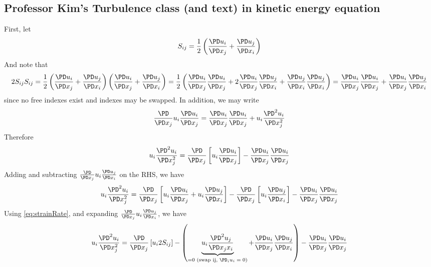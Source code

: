 \documentclass[11pt]{article}
\begin{document}
\subsection{Professor Kim's Turbulence class (and text) in kinetic energy equation}
First, let
\begin{equation} \label{eq:strainRate}
	S_{ij} = \frac{1}{2}
	\left(
	\frac{\PD u_i}{\PD x_j} +
	\frac{\PD u_j}{\PD x_i}
	\right)
\end{equation}
And note that
\begin{equation} \label{eq:strainIdentity}
	2 S_{ij} S_{ij} =
	\frac{1}{2} \left( \frac{\PD u_i}{\PD x_j} + \frac{\PD u_j}{\PD x_i} \right)
	\left( \frac{\PD u_i}{\PD x_j} + \frac{\PD u_j}{\PD x_i} \right)
	= \frac{1}{2} \left( \frac{\PD u_i}{\PD x_j} \frac{\PD u_i}{\PD x_j}
	+ 2 \frac{\PD u_i}{\PD x_j} \frac{\PD u_j}{\PD x_i}
	+ \frac{\PD u_j}{\PD x_i} \frac{\PD u_j}{\PD x_i} \right)
	= \frac{\PD u_i}{\PD x_j} \frac{\PD u_i}{\PD x_j}
	+ \frac{\PD u_i}{\PD x_j} \frac{\PD u_j}{\PD x_i}
\end{equation}
since no free indexes exist and indexes may be swapped. In addition, we may write
\begin{equation}
	\frac{\PD}{\PD x_j} u_i \frac{\PD u_i}{\PD x_j} =
	\frac{\PD u_i}{\PD x_j}\frac{\PD u_i}{\PD x_j} +
	u_i \frac{\PD^2 u_i}{\PD x_j^2}
\end{equation}
Therefore
\begin{equation} \label{eq:secondIdentity}
	u_i \frac{\PD^2 u_i}{\PD x_j^2} =
	\frac{\PD}{\PD x_j} \left[ u_i \frac{\PD u_i}{\PD x_j} \right] -
	\frac{\PD u_i}{\PD x_j}\frac{\PD u_i}{\PD x_j}
\end{equation}
Adding and subtracting $\frac{\PD}{\PD x_j} u_i \frac{\PD u_j}{\PD x_i}$ on the RHS, we have
\begin{equation}
	u_i \frac{\PD^2 u_i}{\PD x_j^2} =
	\frac{\PD}{\PD x_j} \left[ u_i \frac{\PD u_i}{\PD x_j} + u_i \frac{\PD u_j}{\PD x_i} \right] -
	\frac{\PD}{\PD x_j} \left[ u_i \frac{\PD u_j}{\PD x_i} \right] -
	\frac{\PD u_i}{\PD x_j}\frac{\PD u_i}{\PD x_j}
\end{equation}
Using \ref{eq:strainRate}, and expanding $\frac{\PD}{\PD x_j} u_i \frac{\PD u_j}{\PD x_i}$, we have
\begin{equation}
	u_i \frac{\PD^2 u_i}{\PD x_j^2} =
	\frac{\PD}{\PD x_j} \left[ u_i 2 S_{ij} \right] -
	\left(
	\underbrace{u_i \frac{\PD^2 u_j}{\PD x_j x_i}}_{=0 \text{ (swap ij, $\PD_i u_i =0$)}}
	+
	\frac{\PD u_i}{\PD x_j} \frac{\PD u_j}{\PD x_i}
	\right) -
	\frac{\PD u_i}{\PD x_j}\frac{\PD u_i}{\PD x_j}
\end{equation}
\end{document}
